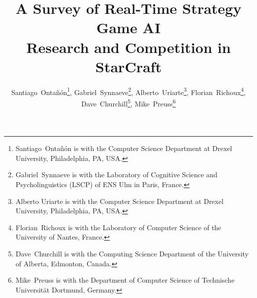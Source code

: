 \documentclass[journal]{IEEEtran}
\begin{document}
%
\title{A Survey of Real-Time Strategy Game AI\\ Research and Competition in StarCraft}
%
%
%


\author{Santiago~Onta\~{n}\'{o}n\thanks{Santiago~Onta\~{n}\'{o}n is with the Computer Science Department at Drexel University, Philadelphia, PA, USA.},
        Gabriel~Synnaeve\thanks{Gabriel~Synnaeve is with the Laboratory of Cognitive Science and Psycholinguistics (LSCP) of ENS Ulm in Paris, France.},
        Alberto~Uriarte\thanks{Alberto Uriarte is with the Computer Science Department at Drexel University, Philadelphia, PA, USA.},
        Florian~Richoux\thanks{Florian~Richoux is with the Laboratory of Computer Science of the University of Nantes, France.},
        Dave~Churchill\thanks{Dave~Churchill is with the Computing Science Department of the University of Alberta, Edmonton, Canada.},
        Mike~Preuss\thanks{Mike~Preuss is with the Department of Computer Science of Technische Universit{\"a}t Dortmund, Germany.}}



% 
%
\end{document}
